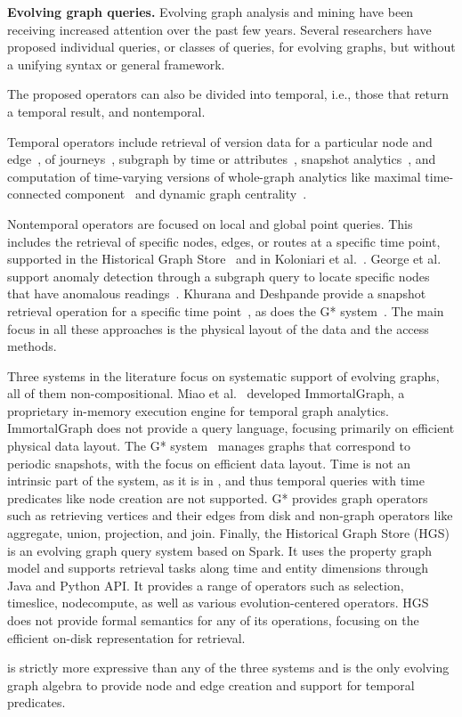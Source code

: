 {\bf Evolving graph queries.}  Evolving graph analysis and mining have
been receiving increased attention over the past few years.  Several
researchers have proposed individual queries, or classes of queries,
for evolving graphs, but without a unifying syntax or general
framework.

The proposed operators can also be divided into temporal, i.e., those
that return a temporal result, and nontemporal.

Temporal operators include retrieval of version data for a particular
node and edge~\cite{Khurana2016}, of
journeys~\cite{Casteigts2011,George2009}, subgraph by time or
attributes~\cite{Huo2014,Khurana2016}, snapshot
analytics~\cite{Khurana2016,Labouseur2015,Miao2015}, and computation
of time-varying versions of whole-graph analytics like maximal
time-connected component~\cite{Ferreira2004} and dynamic graph
centrality~\cite{Lerman2010}.

Nontemporal operators are focused on local and global point queries.
This includes the retrieval of specific nodes, edges, or routes at a
specific time point, supported in the Historical Graph
Store~\cite{Khurana2016} and in Koloniari et al.~\cite{Koloniari2012}.
George et al. support anomaly detection through a subgraph query to
locate specific nodes that have anomalous readings~\cite{George2009}.
Khurana and Deshpande provide a snapshot retrieval operation for a
specific time point~\cite{Khurana2013}, as does the G*
system~\cite{Labouseur2015}.  The main focus in all these approaches
is the physical layout of the data and the access methods.


Three systems in the literature focus on systematic support of
evolving graphs, all of them non-compositional.  Miao et
al.~\cite{Miao2015} developed ImmortalGraph, a proprietary in-memory
execution engine for temporal graph analytics.  ImmortalGraph does not
provide a query language, focusing primarily on efficient physical
data layout.  The G* system~\cite{Labouseur2015} manages graphs that
correspond to periodic snapshots, with the focus on efficient data
layout.  Time is not an intrinsic part of the system, as it is in
\tga, and thus temporal queries with time predicates like node
creation are not supported.  G* provides graph operators such as
retrieving vertices and their edges from disk and non-graph operators
like aggregate, union, projection, and join.  Finally, the Historical
Graph Store (HGS)~\cite{Khurana2016} is an evolving graph query system
based on Spark.  It uses the property graph model and supports
retrieval tasks along time and entity dimensions through Java and
Python API.  It provides a range of operators such as selection,
timeslice, nodecompute, as well as various evolution-centered
operators.  HGS does not provide formal semantics for any of its
operations, focusing on the efficient on-disk representation for
retrieval.

\tga is strictly more expressive than any of the three systems and is
the only evolving graph algebra to provide node and edge creation and
support for temporal predicates.
